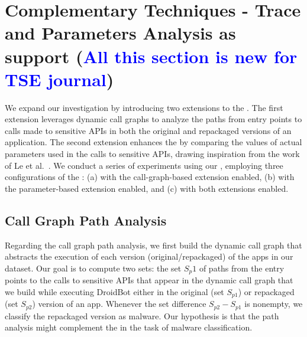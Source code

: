 \section{Complementary Techniques - Trace and Parameters Analysis as \mas support (\textcolor{blue}{All this section is new for TSE journal})}\label{sec:complementary}


We expand our investigation by introducing two extensions to the \mas. The first extension leverages dynamic call graphs
to analyze the paths from entry points to calls made to sensitive APIs in both the original and repackaged versions of an application.
The second extension enhances the \mas by comparing the values of actual parameters used in the calls to sensitive APIs,
drawing inspiration from the work of Le et al.~\cite{le2018towards}. We conduct a series of experiments using our \cds,
employing three configurations of the \mas: (a) with the call-graph-based extension enabled,
(b) with the parameter-based extension enabled, and (c) with both extensions enabled.

\subsection{Call Graph Path Analysis}


Regarding the call graph path analysis, we first build the dynamic call graph that abstracts the execution
of each version (original/repackaged) of the apps in our dataset. Our goal is to compute two sets: the set $S_p1$ of
paths from the entry points to the calls to sensitive APIs that appear in the dynamic call graph
that we build while executing DroidBot either in the original (set $S_{p1}$) or repackaged (set $S_{p2}$) version
of an app. Whenever the set difference $S_{p2} - S_{p1}$ is nonempty, we classify the repackaged version  as
malware. Our hypothesis is that the path analysis might complement the \mas in the task of malware classification.

